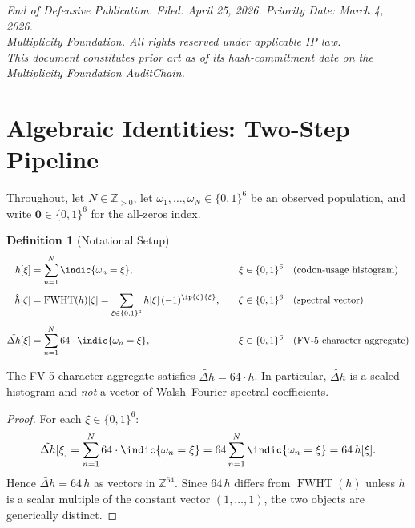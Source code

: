 \documentclass[12pt,letterpaper]{article}
\theoremstyle{definition}
\newtheorem{definition}{Definition}[section]
\theoremstyle{plain}
\theoremstyle{remark}
\newcommand{\FWHT}{\operatorname{FWHT}}
\newcommand{\hhat}{\hat{h}}
\begin{document}
\vspace{1em}
\noindent\textit{End of Defensive Publication. Filed: April 25, 2026. Priority Date: March 4, 2026.}\\
\noindent\textit{Multiplicity Foundation. All rights reserved under applicable IP law.}\\
\noindent\textit{This document constitutes prior art as of its hash-commitment date on the Multiplicity Foundation AuditChain.}

\section{Algebraic Identities: Two-Step Pipeline}

Throughout, let $N \in \mathbb{Z}_{>0}$, let
$\omega_1,\ldots,\omega_N \in \{0,1\}^6$ be an observed population,
and write $\mathbf{0} \in \{0,1\}^6$ for the all-zeros index.

\begin{definition}[Notational Setup]
\label{def:notation}
\begin{alignat}{2}
  h[\xi]        &= \sum_{n=1}^{N}\indic{\omega_n = \xi},
    \quad &\xi &\in \{0,1\}^6
    \quad\text{(codon-usage histogram)} \\[4pt]
  \hhat[\zeta]  &= \FWHT(h)[\zeta]
                 = \sum_{\xi \in \{0,1\}^6} h[\xi]\,(-1)^{\ip{\zeta}{\xi}},
    \quad &\zeta &\in \{0,1\}^6
    \quad\text{(spectral vector)} \\[4pt]
  \tilde{\Delta h}[\xi]
                &= \sum_{n=1}^{N} 64\cdot\indic{\omega_n = \xi},
    \quad &\xi &\in \{0,1\}^6
    \quad\text{(FV-5 character aggregate)}
\end{alignat}
\end{definition}

\begin{proposition}
\label{prop:char-agg}
The FV-5 character aggregate satisfies $\tilde{\Delta h} = 64\cdot h$.
In particular, $\tilde{\Delta h}$ is a scaled histogram and \emph{not}
a vector of Walsh--Fourier spectral coefficients.
\end{proposition}

\begin{proof}
For each $\xi \in \{0,1\}^6$:
\[
  \tilde{\Delta h}[\xi]
    = \sum_{n=1}^{N} 64\cdot\indic{\omega_n = \xi}
    = 64\sum_{n=1}^{N}\indic{\omega_n = \xi}
    = 64\,h[\xi].
\]
Hence $\tilde{\Delta h} = 64\,h$ as vectors in $\mathbb{Z}^{64}$.
Since $64\,h$ differs from $\FWHT(h)$ unless $h$ is a scalar multiple
of the constant vector $(1,\ldots,1)$, the two objects are generically distinct.
\end{proof}
\end{document}
